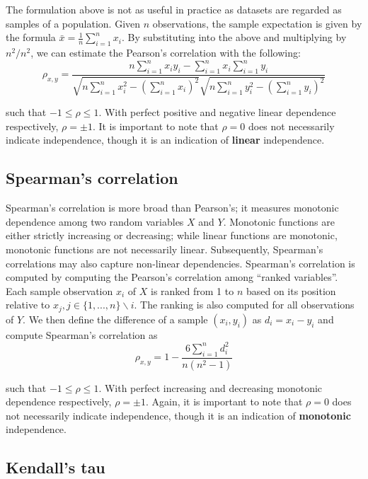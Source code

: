 The formulation above is not as useful in practice as datasets are regarded as
samples of a population. Given $n$ observations, the sample expectation is given
by the formula  $\bar{x}=\frac{1}{n}\sum\limits_{i=1}^{n}x_i$. By substituting
into the above and multiplying by $n^2/n^2$, we can estimate the Pearson's
correlation with the following:
$$\rho_{x,y}=
\frac{n \sum\limits_{i=1}^{n} x_i y_i - \sum\limits_{i=1}^{n} x_i
	\sum\limits_{i=1}^{n} y_i}
{\sqrt{n\sum\limits_{i=1}^{n} x_i^2-\left(\sum\limits_{i=1}^{n} x_i\right)^2} 
	\sqrt{n\sum\limits_{i=1}^{n} y_i^2-\left(\sum\limits_{i=1}^{n} y_i\right)^2}}$$ 

\noindent such that $-1 \leq \rho \leq 1$. With perfect positive and negative 
linear 
dependence respectively, $\rho=\pm1$.
It is important to note that $\rho=0$ does not necessarily indicate
independence, though it is an indication of \textbf{linear} independence.

\subsection{Spearman's correlation}

Spearman's correlation is more broad than Pearson's; it measures monotonic
dependence among two random variables $X$ and $Y$. Monotonic functions are
either strictly increasing or decreasing; while linear functions are monotonic,
monotonic functions are not necessarily linear. Subsequently, Spearman's
correlations may also capture non-linear dependencies. Spearman's correlation is
computed by computing the Pearson's correlation among ``ranked variables''. Each
sample observation $x_i$ of $X$ is ranked from 1 to $n$ based on its position
relative to $x_j, j\in\{1,...,n\}\backslash{i}$. The ranking is also computed
for all observations of $Y$. We then define the difference of a sample
$(x_i,y_i)$ as $d_i=x_i-y_i$ and compute Spearman's correlation as
$$\rho_{x,y}=1-\frac{6 \sum\limits_{i=1}^{n}d_i^2}{n(n^2-1)}$$

\noindent such that $-1 \leq \rho \leq 1$. With perfect increasing and 
decreasing 
monotonic dependence respectively,
$\rho=\pm1$. Again, it is important to note that $\rho=0$ does not necessarily
indicate independence, though it is an indication of \textbf{monotonic}
independence.

\subsection{Kendall's tau}

